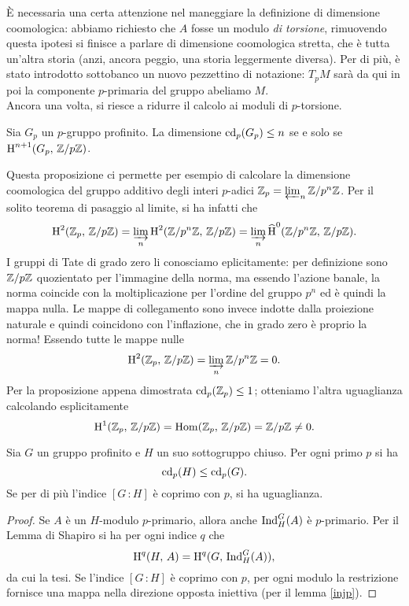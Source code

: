 È necessaria una certa attenzione nel maneggiare la definizione di dimensione coomologica: abbiamo richiesto che $ A $ fosse un modulo \emph{di torsione}, rimuovendo questa ipotesi si finisce a parlare di dimensione coomologica stretta, che è tutta un'altra storia (anzi, ancora peggio, una storia leggermente diversa). Per di più, è stato introdotto sottobanco un nuovo pezzettino di notazione: $ T_p M $ sarà da qui in poi la componente $ p $-primaria del gruppo abeliamo $ M $. \\


Ancora una volta, si riesce a ridurre il calcolo ai moduli di $ p $-torsione.

\begin{proposition}
	Sia $ G_p $ un $ p $-gruppo profinito. La dimensione $ \operatorname{cd}_p(G_p) \leq n $ se e solo se $ \operatorname{H}^{n+1}(G_p, \, \mathbb{Z}/p\mathbb{Z}) $.
\end{proposition}

Questa proposizione ci permette per esempio di calcolare la dimensione coomologica del gruppo additivo degli interi $ p $-adici $ \mathbb{Z}_p = \varprojlim_n \mathbb{Z}/p^n\mathbb{Z} $. Per il solito teorema di pasaggio al limite, si ha infatti che 
\[ \operatorname{H}^2(\mathbb{Z}_p , \, \mathbb{Z}/p\mathbb{Z}) = \varinjlim_n \operatorname{H}^2(\mathbb{Z}/p^n\mathbb{Z}, \, \mathbb{Z}/p\mathbb{Z}) = \varinjlim_n \operatorname{\widehat{H}}^0(\mathbb{Z}/p^n\mathbb{Z}, \, \mathbb{Z}/p\mathbb{Z}). \]
I gruppi di Tate di grado zero li conosciamo eplicitamente: per definizione sono $ \mathbb{Z}/p\mathbb{Z} $ quozientato per l'immagine della norma, ma essendo l'azione banale, la norma coincide con la moltiplicazione per l'ordine del gruppo $ p^n $ ed è quindi la mappa nulla. Le mappe di collegamento sono invece indotte dalla proiezione naturale e quindi coincidono con l'inflazione, che in grado zero è proprio la norma! Essendo tutte le mappe nulle
\[ \operatorname{H}^2(\mathbb{Z}_p , \, \mathbb{Z}/p\mathbb{Z}) = \varinjlim_n \mathbb{Z}/p^n\mathbb{Z} = 0. \]
Per la proposizione appena dimostrata $ \operatorname{cd}_p(\mathbb{Z}_p) \leq 1 $; otteniamo l'altra uguaglianza calcolando esplicitamente $$  \operatorname{H}^1(\mathbb{Z}_p , \, \mathbb{Z}/p\mathbb{Z}) = \operatorname{Hom}(\mathbb{Z}_p , \, \mathbb{Z}/p\mathbb{Z}) = \mathbb{Z}/p\mathbb{Z} \neq 0.  $$

\begin{proposition}
	Sia $ G $ un gruppo profinito e $ H $ un suo sottogruppo chiuso. Per ogni primo $ p $ si ha
	\[ \operatorname{cd}_p(H) \leq \operatorname{cd}_p(G). \]
	Se per di più l'indice $ [G\,\colon H] $ è coprimo con $ p $, si ha uguaglianza.
\end{proposition}
\begin{proof}
	Se $ A $ è un $ H $-modulo $ p $-primario, allora anche $ \operatorname{Ind}_H^G(A) $ è $ p $-primario. Per il Lemma di Shapiro si ha per ogni indice $ q $ che
	\[ \operatorname{H}^q(H, \, A) = \operatorname{H}^q(G, \, \operatorname{Ind}_H^G(A)),  \]
	da cui la tesi. Se l'indice $ [G\,\colon H] $ è coprimo con $ p $, per ogni modulo la restrizione fornisce una mappa nella direzione opposta iniettiva (per il lemma \ref{injp}).
\end{proof}

